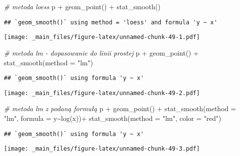 \documentclass[
]{book}
\newenvironment{Shaded}{\begin{snugshade}}{\end{snugshade}}
\newcommand{\AttributeTok}[1]{\textcolor[rgb]{0.77,0.63,0.00}{#1}}
\newcommand{\CommentTok}[1]{\textcolor[rgb]{0.56,0.35,0.01}{\textit{#1}}}
\newcommand{\FunctionTok}[1]{\textcolor[rgb]{0.00,0.00,0.00}{#1}}
\newcommand{\NormalTok}[1]{#1}
\newcommand{\SpecialCharTok}[1]{\textcolor[rgb]{0.00,0.00,0.00}{#1}}
\newcommand{\StringTok}[1]{\textcolor[rgb]{0.31,0.60,0.02}{#1}}
\begin{document}
\begin{Shaded}
\begin{Highlighting}[]
\CommentTok{\# metoda loess}
\NormalTok{p }\SpecialCharTok{+} \FunctionTok{geom\_point}\NormalTok{() }\SpecialCharTok{+} \FunctionTok{stat\_smooth}\NormalTok{()}
\end{Highlighting}
\end{Shaded}

\begin{verbatim}
## `geom_smooth()` using method = 'loess' and formula 'y ~ x'
\end{verbatim}

\texttt{[image: \_main\_files/figure-latex/unnamed-chunk-49-1.pdf]}

\begin{Shaded}
\begin{Highlighting}[]
\CommentTok{\# metoda lm {-} dopasowanie do linii prostej}
\NormalTok{p }\SpecialCharTok{+} \FunctionTok{geom\_point}\NormalTok{() }\SpecialCharTok{+} \FunctionTok{stat\_smooth}\NormalTok{(}\AttributeTok{method =} \StringTok{"lm"}\NormalTok{)}
\end{Highlighting}
\end{Shaded}

\begin{verbatim}
## `geom_smooth()` using formula 'y ~ x'
\end{verbatim}

\texttt{[image: \_main\_files/figure-latex/unnamed-chunk-49-2.pdf]}

\begin{Shaded}
\begin{Highlighting}[]
\CommentTok{\# metoda lm z podaną formułą}
\NormalTok{p }\SpecialCharTok{+} \FunctionTok{geom\_point}\NormalTok{() }\SpecialCharTok{+} \FunctionTok{stat\_smooth}\NormalTok{(}\AttributeTok{method =} \StringTok{"lm"}\NormalTok{, }\AttributeTok{formula =}\NormalTok{ y}\SpecialCharTok{\textasciitilde{}}\FunctionTok{log}\NormalTok{(x))}\SpecialCharTok{+}
  \FunctionTok{stat\_smooth}\NormalTok{(}\AttributeTok{method =} \StringTok{"lm"}\NormalTok{, }\AttributeTok{color =} \StringTok{"red"}\NormalTok{)}
\end{Highlighting}
\end{Shaded}

\begin{verbatim}
## `geom_smooth()` using formula 'y ~ x'
\end{verbatim}

\texttt{[image: \_main\_files/figure-latex/unnamed-chunk-49-3.pdf]}
\end{document}
